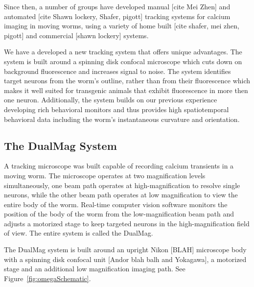 Since then, a number of groups have developed manual [cite Mei Zhen]  and automated  [cite Shawn lockery, Shafer, pigott]\citep{faumont_image-free_2011}
 tracking systems for calcium imaging in moving worms, using a variety of home built [cite shafer, mei zhen, pigott] and commercial [shawn lockery] systems. 

We have a developed a new tracking system that offers unique advantages. The system is built around a spinning disk confocal microscope which cuts down on background fluorescence and increases signal to noise. The system identifies target neurons from the worm's outline, rather than from their fluorescence which makes it well suited for transgenic animals that exhibit fluorescence in more then one neuron. Additionally, the system builds on our previous experience developing rich behavioral monitors and thus provides high spatiotemporal behavioral data including the worm's instantaneous curvature and orientation.  


\subsection{The DualMag System}
A tracking microscope was built capable of recording calcium transients in a moving worm. The microscope operates at two magnification levels simultaneously, one beam path operates at high-magnification to resolve single neurons, while the other beam path operates at low  magnification to view the entire body of the worm. Real-time computer vision software monitors the position of the body of the worm from the low-magnification beam path and adjusts a motorized stage to keep targeted neurons in the high-magnification field of view. The entire system is called the DualMag.


The DualMag system is built around an upright Nikon [BLAH] microscope body with a spinning disk confocal unit [Andor blah balh and Yokagawa], a motorized stage and an additional low magnification imaging path. See Figure~\ref{fig:omegaSchematic}. 


